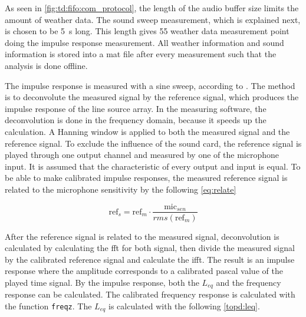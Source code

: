 
As seen in \autoref{fig:td:fifo:com_protocol}, the length of the audio buffer size limits the amount of weather data. The sound sweep measurement, which is explained next, is chosen to be \SI{5}{\second} long. This length gives 55 weather data measurement point doing the impulse response measurement. All weather information and sound information is stored into a mat file after every measurement such that the analysis is done offline.

The impulse response is measured with a sine sweep, according to \citep{mller2001transfer}. The method is to deconvolute the measured signal by the reference signal, which produces the impulse response of the line source array. In the measuring software, the deconvolution is done in the frequency domain, because it speeds up the calculation. A Hanning window is applied to both the measured signal and the reference signal. To exclude the influence of the sound card, the reference signal is played through one output channel and measured by one of the microphone input. It is assumed that the characteristic of every output and input is equal. To be able to make calibrated impulse responses, the measured reference signal is related to the microphone sensitivity by the following \autoref{eq:relate}

\begin{equation}\label{eq:relate}
\text{ref}_{s} = \text{ref}_{m} \cdot    \frac{\text{mic}_{sen}}{rms(\text{ref}_{m})}
\end{equation}

\startexplain
{}
\stopexplain

After the reference signal is related to the measured signal, deconvolution is calculated by calculating the \gls{fft} for both signal, then divide the measured signal by the calibrated reference signal and calculate the \gls{ifft}. The result is an impulse response where the amplitude corresponds to a calibrated pascal value of the played time signal. By the impulse response, both the $L_{eq}$ and the frequency response can be calculated. The calibrated frequency response is calculated with the \matlab function \texttt{freqz}. The $L_{eq}$ is calculated with the following \autoref{topd:leq}.


